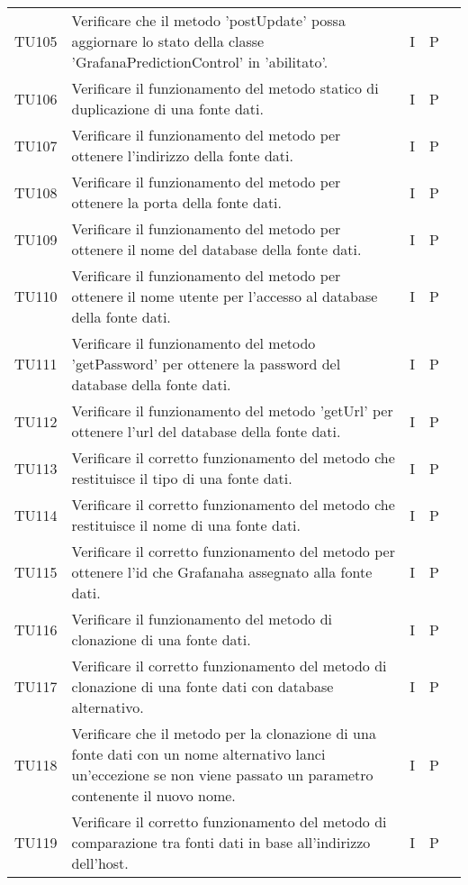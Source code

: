 \begin{longtable} {
		>{}p{15mm} 
		>{}p{79.5mm}
		>{}p{15mm} 
		>{}p{15mm}
		>{}p{0mm}}
	TU105		& Verificare che il metodo 'postUpdate' possa aggiornare lo stato della classe 'GrafanaPredictionControl' in 'abilitato'.& I & P &\TBstrut \\ [2mm]
	TU106		& Verificare il funzionamento del metodo statico di duplicazione di una fonte dati.& I & P &\TBstrut \\ [2mm]
	TU107		& Verificare il funzionamento del metodo per ottenere l'indirizzo della fonte dati.& I & P &\TBstrut \\ [2mm]
	TU108		& Verificare il funzionamento del metodo per ottenere la porta della fonte dati.& I & P &\TBstrut \\ [2mm]
	TU109		& Verificare il funzionamento del metodo per ottenere il nome del database della fonte dati.& I & P &\TBstrut \\ [2mm]
	TU110		& Verificare il funzionamento del metodo per ottenere il nome utente per l'accesso al database della fonte dati.& I & P &\TBstrut \\ [2mm]
	TU111		& Verificare il funzionamento del metodo 'getPassword' per ottenere la password del database della fonte dati.& I & P &\TBstrut \\ [2mm]
	TU112		& Verificare il funzionamento del metodo 'getUrl' per ottenere l'url del database della fonte dati.& I & P &\TBstrut \\ [2mm]
	TU113		& Verificare il corretto funzionamento del metodo che restituisce il tipo di una fonte dati. & I & P &\TBstrut \\ [2mm]
	TU114		& Verificare il corretto funzionamento del metodo che restituisce il nome di una fonte dati. & I & P &\TBstrut \\ [2mm]
	TU115		& Verificare il corretto funzionamento del metodo per ottenere l'id che Grafana\glosp ha assegnato alla fonte dati. & I & P &\TBstrut \\ [2mm]
	TU116		& Verificare il funzionamento del metodo di clonazione di una fonte dati.& I & P &\TBstrut \\ [2mm]
	TU117		& Verificare il corretto funzionamento del metodo di clonazione di una fonte dati con database alternativo. & I & P &\TBstrut \\ [2mm]
	TU118		& Verificare che il metodo per la clonazione di una fonte dati con un nome alternativo lanci un'eccezione se non viene passato un parametro contenente il nuovo nome.& I & P &\TBstrut \\ [2mm]
	TU119		& Verificare il corretto funzionamento del metodo di comparazione tra fonti dati in base all'indirizzo dell'host. & I & P &\TBstrut \\ [2mm]

\end{longtable}
